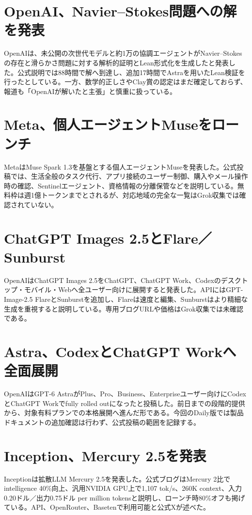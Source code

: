 \section{OpenAI、Navier--Stokes問題への解を発表}
OpenAIは、未公開の次世代モデルと約1万の協調エージェントがNavier--Stokesの存在と滑らかさ問題に対する解析的証明とLean形式化を生成したと発表した。公式説明では88時間で解へ到達し、追加17時間でAstraを用いたLean検証を行ったとしている。一方、数学的正しさやClay賞の認定はまだ確定しておらず、報道も「OpenAIが解いたと主張」と慎重に扱っている。
\section{Meta、個人エージェントMuseをローンチ}
MetaはMuse Spark 1.3を基盤とする個人エージェントMuseを発表した。公式投稿では、生活全般のタスク代行、アプリ接続のユーザー制御、購入やメール操作時の確認、Sentinelエージェント、資格情報の分離保管などを説明している。無料枠は週1億トークンまでとされるが、対応地域の完全な一覧はGrok収集では確認されていない。
\section{ChatGPT Images 2.5とFlare／Sunburst}
OpenAIはChatGPT Images 2.5をChatGPT、ChatGPT Work、Codexのデスクトップ・モバイル・Webへ全ユーザー向けに展開すると発表した。APIにはGPT-Image-2.5 FlareとSunburstを追加し、Flareは速度と編集、Sunburstはより精細な生成を重視すると説明している。専用ブログURLや価格はGrok収集では未確認である。
\section{Astra、CodexとChatGPT Workへ全面展開}
OpenAIはGPT-6 AstraがPlus、Pro、Business、Enterpriseユーザー向けにCodexとChatGPT Workでfully rolled outになったと投稿した。前日までの段階的提供から、対象有料プランでの本格展開へ進んだ形である。今回のDaily版では製品ドキュメントの追加確認は行わず、公式投稿の範囲を記録する。
\section{Inception、Mercury 2.5を発表}
Inceptionは拡散LLM Mercury 2.5を発表した。公式ブログはMercury 2比でintelligence 40\%向上、汎用NVIDIA GPU上で1,107 tok/s、260K context、入力0.20ドル／出力0.75ドル per million tokensと説明し、ローンチ時80\%オフも掲げている。API、OpenRouter、Basetenで利用可能と公式Xが述べた。
